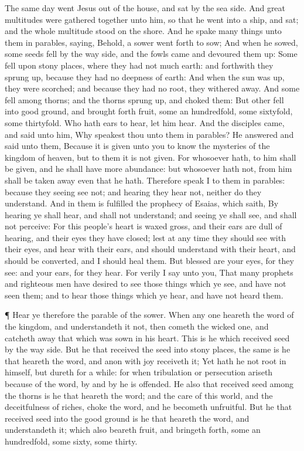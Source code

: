  The same day went Jesus out of the house, and sat by the
sea side.  And great multitudes were gathered together unto
him, so that he went into a ship, and sat; and the whole multitude stood
on the shore.  And he spake many things unto them in
parables, saying, Behold, a sower went forth to sow;  And
when he sowed, some seeds fell by the way side, and the fowls came and
devoured them up:  Some fell upon stony places, where they
had not much earth: and forthwith they sprung up, because they had no
deepness of earth:  And when the sun was up, they were
scorched; and because they had no root, they withered away. 
And some fell among thorns; and the thorns sprung up, and choked them:
 But other fell into good ground, and brought forth fruit,
some an hundredfold, some sixtyfold, some thirtyfold.  Who
hath ears to hear, let him hear.  And the disciples came,
and said unto him, Why speakest thou unto them in parables?
 He answered and said unto them, Because it is given unto
you to know the mysteries of the kingdom of heaven, but to them it is
not given.  For whosoever hath, to him shall be given, and
he shall have more abundance: but whosoever hath not, from him shall be
taken away even that he hath.  Therefore speak I to them in
parables: because they seeing see not; and hearing they hear not,
neither do they understand.  And in them is fulfilled the
prophecy of Esaias, which saith, By hearing ye shall hear, and shall not
understand; and seeing ye shall see, and shall not perceive:
 For this people's heart is waxed gross, and their ears are
dull of hearing, and their eyes they have closed; lest at any time they
should see with their eyes, and hear with their ears, and should
understand with their heart, and should be converted, and I should heal
them.  But blessed are your eyes, for they see: and your
ears, for they hear.  For verily I say unto you, That many
prophets and righteous men have desired to see those things which ye
see, and have not seen them; and to hear those things which ye hear, and
have not heard them.

 ¶ Hear ye therefore the parable of the sower.
 When any one heareth the word of the kingdom, and
understandeth it not, then cometh the wicked one, and catcheth away that
which was sown in his heart. This is he which received seed by the way
side.  But he that received the seed into stony places, the
same is he that heareth the word, and anon with joy receiveth it;
 Yet hath he not root in himself, but dureth for a while:
for when tribulation or persecution ariseth because of the word, by and
by he is offended.  He also that received seed among the
thorns is he that heareth the word; and the care of this world, and the
deceitfulness of riches, choke the word, and he becometh unfruitful.
 But he that received seed into the good ground is he that
heareth the word, and understandeth it; which also beareth fruit, and
bringeth forth, some an hundredfold, some sixty, some thirty.

